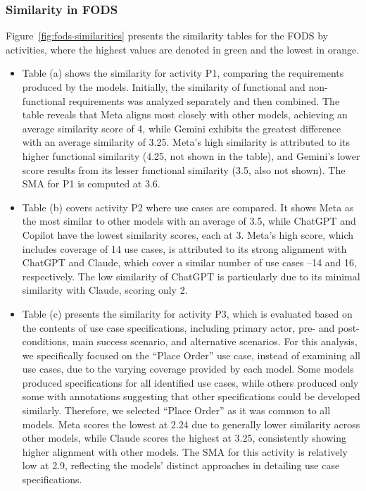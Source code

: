 \subsubsection{Similarity in FODS}
\label{sssec:fods-similarity}
Figure~\ref{fig:fods-similarities} presents the similarity tables for the FODS by activities, where the highest values are denoted in green and the lowest in orange. 

\begin{itemize}
	\item Table (a) shows the similarity for activity P1, comparing the requirements produced by the models. Initially, the similarity of functional and non-functional requirements was analyzed separately and then combined. The table reveals that Meta aligns most closely with other models, achieving an average similarity score of 4, while Gemini exhibits the greatest difference with an average similarity of 3.25. Meta's high similarity is attributed to its higher functional similarity (4.25, not shown in the table), and Gemini's lower score results from its lesser functional similarity (3.5, also not shown). The SMA for P1 is computed at 3.6.
	
	\item Table (b) covers activity P2 where use cases are compared. It shows Meta as the most similar to other models with an average of 3.5, while ChatGPT and Copilot have the lowest similarity scores, each at 3. Meta's high score, which includes coverage of 14 use cases, is attributed to its strong alignment with ChatGPT and Claude, which cover a similar number of use cases --14 and 16, respectively. The low similarity of ChatGPT is particularly due to its minimal similarity with Claude, scoring only 2.
	
	\item Table (c) presents the similarity for activity P3, which is evaluated based on the contents of use case specifications, including primary actor, pre- and post-conditions, main success scenario, and alternative scenarios. For this analysis, we specifically focused on the ``Place Order'' use case, instead of examining all use cases, due to the varying coverage provided by each model. Some models produced specifications for all identified use cases, while others produced only some with annotations suggesting that other specifications could be developed similarly. Therefore, we selected ``Place Order'' as it was common to all models. Meta scores the lowest at 2.24 due to generally lower similarity across other models, while Claude scores the highest at 3.25, consistently showing higher alignment with other models. The SMA for this activity is relatively low at 2.9, reflecting the models' distinct approaches in detailing use case specifications.
	

\end{itemize}
